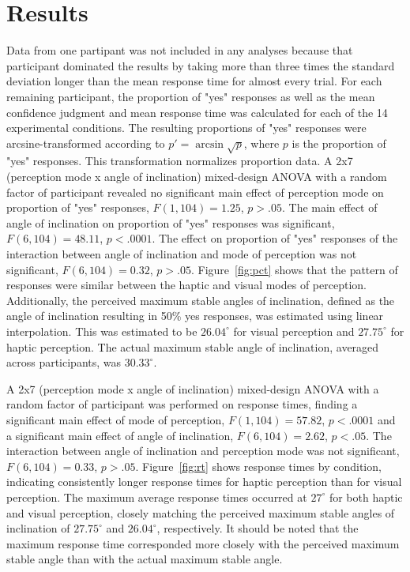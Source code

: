 \documentclass{article}
\begin{document}
\section{Results}
Data from one partipant was not included in any analyses because that participant dominated the results by taking more than three times the standard deviation longer than the mean response time for almost every trial. For each remaining participant, the proportion of "yes" responses as well as the mean confidence judgment and mean response time was calculated for each of the 14 experimental conditions.  The resulting proportions of "yes" responses were arcsine-transformed according to $p'=\arcsin \sqrt{p}$, where $p$ is the proportion of "yes" responses. This transformation normalizes proportion data. A 2x7 (perception mode x angle of inclination) mixed-design ANOVA with a random factor of participant revealed no significant main effect of perception mode on proportion of "yes" responses, $F(1, 104) = 1.25$, $p > .05$. The main effect of angle of inclination on proportion of "yes" responses was significant, $F(6, 104) = 48.11$, $p < .0001$. The effect on proportion of "yes" responses of the interaction between angle of inclination and mode of perception was not significant, $F(6, 104) = 0.32$, $p > .05$. Figure~\ref{fig:pct} shows that the pattern of responses were similar between the haptic and visual modes of perception. Additionally, the perceived maximum stable angles of inclination, defined as the angle of inclination resulting in 50\% yes responses, was estimated using linear interpolation. This was estimated to be $26.04^\circ$ for visual perception and $27.75^\circ$ for haptic perception. The actual maximum stable angle of inclination, averaged across participants, was $30.33^\circ$.

A 2x7 (perception mode x angle of inclination) mixed-design ANOVA with a random factor of participant was performed on response times, finding a significant main effect of mode of perception, $F(1, 104) = 57.82$, $p<.0001$ and a significant main effect of angle of inclination, $F(6, 104) = 2.62$, $p < .05$. The interaction between angle of inclination and perception mode was not significant, $F(6, 104) = 0.33$, $p > .05$. Figure~\ref{fig:rt} shows response times by condition, indicating consistently longer response times for haptic perception than for visual perception. The maximum average response times occurred at $27^\circ$ for both haptic and visual perception, closely matching the perceived maximum stable angles of inclination of $27.75^\circ$ and $26.04^\circ$, respectively. It should be noted that the maximum response time corresponded more closely with the perceived maximum stable angle than with the actual maximum stable angle.
\end{document}
